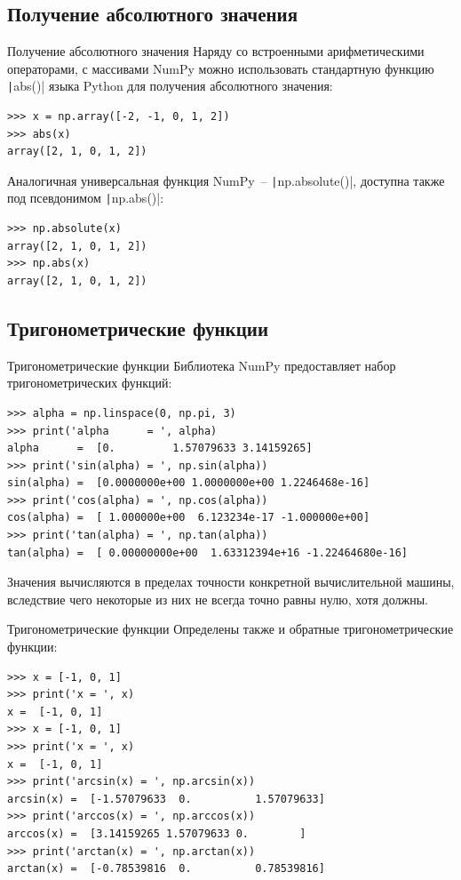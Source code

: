 \documentclass[aspectratio=169, mathserif]{beamer}%
\begin{document}
\subsection{Получение абсолютного значения}
\begin{frame}[fragile]{Получение абсолютного значения}
\scriptsize
Наряду со встроенными арифметическими операторами, с массивами NumPy можно использовать стандартную функцию \texttt|abs()| языка Python для получения абсолютного значения:

\begin{verbatim}
>>> x = np.array([-2, -1, 0, 1, 2])
>>> abs(x)
array([2, 1, 0, 1, 2])
\end{verbatim}

Аналогичная универсальная функция NumPy~-- \texttt|np.absolute()|, доступна также под псевдонимом \texttt|np.abs()|:

\begin{verbatim}
>>> np.absolute(x)
array([2, 1, 0, 1, 2])
>>> np.abs(x)
array([2, 1, 0, 1, 2])
\end{verbatim}
\vfil
\end{frame}

\subsection{Тригонометрические функции}
\begin{frame}[fragile]{Тригонометрические функции}
\scriptsize
Библиотека NumPy предоставляет набор тригонометрических функций:

\begin{verbatim}
>>> alpha = np.linspace(0, np.pi, 3)
>>> print('alpha      = ', alpha)
alpha      =  [0.         1.57079633 3.14159265]
>>> print('sin(alpha) = ', np.sin(alpha))
sin(alpha) =  [0.0000000e+00 1.0000000e+00 1.2246468e-16]
>>> print('cos(alpha) = ', np.cos(alpha))
cos(alpha) =  [ 1.000000e+00  6.123234e-17 -1.000000e+00]
>>> print('tan(alpha) = ', np.tan(alpha))
tan(alpha) =  [ 0.00000000e+00  1.63312394e+16 -1.22464680e-16]
\end{verbatim}

Значения вычисляются в пределах точности конкретной вычислительной машины, вследствие чего некоторые из них не всегда точно равны нулю, хотя должны.
\vfill
\end{frame}

\begin{frame}[fragile]{Тригонометрические функции}
\scriptsize
Определены также  и обратные тригонометрические функции:

\begin{verbatim}
>>> x = [-1, 0, 1]
>>> print('x = ', x)
x =  [-1, 0, 1]
>>> x = [-1, 0, 1]
>>> print('x = ', x)
x =  [-1, 0, 1]
>>> print('arcsin(x) = ', np.arcsin(x))
arcsin(x) =  [-1.57079633  0.          1.57079633]
>>> print('arccos(x) = ', np.arccos(x))
arccos(x) =  [3.14159265 1.57079633 0.        ]
>>> print('arctan(x) = ', np.arctan(x))
arctan(x) =  [-0.78539816  0.          0.78539816]
\end{verbatim}
\vfill
\end{frame}
\end{document}
